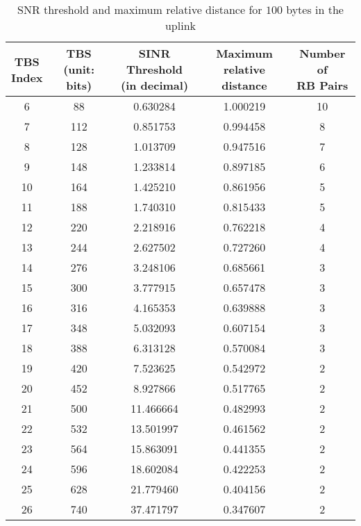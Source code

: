 \begin{table}
	\centering
	\caption{SNR threshold and maximum relative distance for $100$ bytes in the uplink}
	\label{tab:uplink-tbs-distance}
	\begin{tabular}{ccccc}
		\toprule
		\thead{TBS\\Index} &  \thead{TBS \\ (unit: bits)} & \thead{SINR Threshold \\(in decimal) }& \thead{Maximum \\ relative distance}&  \thead{Number of \\RB Pairs} \\
		\midrule
		6 &   88 &        0.630284 &   1.000219 &     10 \\
		7 &  112 &        0.851753 &   0.994458 &      8 \\
		8 &  128 &        1.013709 &   0.947516 &      7 \\
		9 &  148 &        1.233814 &   0.897185 &      6 \\
		10 &  164 &        1.425210 &   0.861956 &      5 \\
		11 &  188 &        1.740310 &   0.815433 &      5 \\
		12 &  220 &        2.218916 &   0.762218 &      4 \\
		13 &  244 &        2.627502 &   0.727260 &      4 \\
		14 &  276 &        3.248106 &   0.685661 &      3 \\
		15 &  300 &        3.777915 &   0.657478 &      3 \\
		16 &  316 &        4.165353 &   0.639888 &      3 \\
		17 &  348 &        5.032093 &   0.607154 &      3 \\
		18 &  388 &        6.313128 &   0.570084 &      3 \\
		19 &  420 &        7.523625 &   0.542972 &      2 \\
		20 &  452 &        8.927866 &   0.517765 &      2 \\
		21 &  500 &       11.466664 &   0.482993 &      2 \\
		22 &  532 &       13.501997 &   0.461562 &      2 \\
		23 &  564 &       15.863091 &   0.441355 &      2 \\
		24 &  596 &       18.602084 &   0.422253 &      2 \\
		25 &  628 &       21.779460 &   0.404156 &      2 \\
		26 &  740 &       37.471797 &   0.347607 &      2 \\
		\bottomrule
	\end{tabular}
\end{table}
